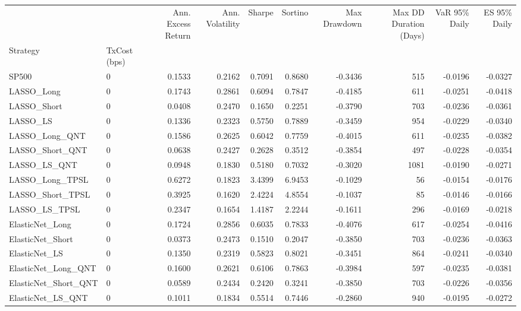 \begin{tabular}{llrrrrrrrr}
\toprule
 &  & Ann. Excess Return & Ann. Volatility & Sharpe & Sortino & Max Drawdown & Max DD Duration (Days) & VaR 95\% Daily & ES 95\% Daily \\
Strategy & TxCost (bps) &  &  &  &  &  &  &  &  \\
\midrule
SP500 & 0 & 0.1533 & 0.2162 & 0.7091 & 0.8680 & -0.3436 & 515 & -0.0196 & -0.0327 \\
\cline{1-10}
LASSO\_Long & 0 & 0.1743 & 0.2861 & 0.6094 & 0.7847 & -0.4185 & 611 & -0.0251 & -0.0418 \\
\cline{1-10}
LASSO\_Short & 0 & 0.0408 & 0.2470 & 0.1650 & 0.2251 & -0.3790 & 703 & -0.0236 & -0.0361 \\
\cline{1-10}
LASSO\_LS & 0 & 0.1336 & 0.2323 & 0.5750 & 0.7889 & -0.3459 & 954 & -0.0229 & -0.0340 \\
\cline{1-10}
LASSO\_Long\_QNT & 0 & 0.1586 & 0.2625 & 0.6042 & 0.7759 & -0.4015 & 611 & -0.0235 & -0.0382 \\
\cline{1-10}
LASSO\_Short\_QNT & 0 & 0.0638 & 0.2427 & 0.2628 & 0.3512 & -0.3854 & 497 & -0.0228 & -0.0354 \\
\cline{1-10}
LASSO\_LS\_QNT & 0 & 0.0948 & 0.1830 & 0.5180 & 0.7032 & -0.3020 & 1081 & -0.0190 & -0.0271 \\
\cline{1-10}
LASSO\_Long\_TPSL & 0 & 0.6272 & 0.1823 & 3.4399 & 6.9453 & -0.1029 & 56 & -0.0154 & -0.0176 \\
\cline{1-10}
LASSO\_Short\_TPSL & 0 & 0.3925 & 0.1620 & 2.4224 & 4.8554 & -0.1037 & 85 & -0.0146 & -0.0166 \\
\cline{1-10}
LASSO\_LS\_TPSL & 0 & 0.2347 & 0.1654 & 1.4187 & 2.2244 & -0.1611 & 296 & -0.0169 & -0.0218 \\
\cline{1-10}
ElasticNet\_Long & 0 & 0.1724 & 0.2856 & 0.6035 & 0.7833 & -0.4076 & 617 & -0.0254 & -0.0416 \\
\cline{1-10}
ElasticNet\_Short & 0 & 0.0373 & 0.2473 & 0.1510 & 0.2047 & -0.3850 & 703 & -0.0236 & -0.0363 \\
\cline{1-10}
ElasticNet\_LS & 0 & 0.1350 & 0.2319 & 0.5823 & 0.8021 & -0.3451 & 864 & -0.0241 & -0.0340 \\
\cline{1-10}
ElasticNet\_Long\_QNT & 0 & 0.1600 & 0.2621 & 0.6106 & 0.7863 & -0.3984 & 597 & -0.0235 & -0.0381 \\
\cline{1-10}
ElasticNet\_Short\_QNT & 0 & 0.0589 & 0.2434 & 0.2420 & 0.3241 & -0.3850 & 703 & -0.0226 & -0.0356 \\
\cline{1-10}
ElasticNet\_LS\_QNT & 0 & 0.1011 & 0.1834 & 0.5514 & 0.7446 & -0.2860 & 940 & -0.0195 & -0.0272 \\

\end{tabular}
